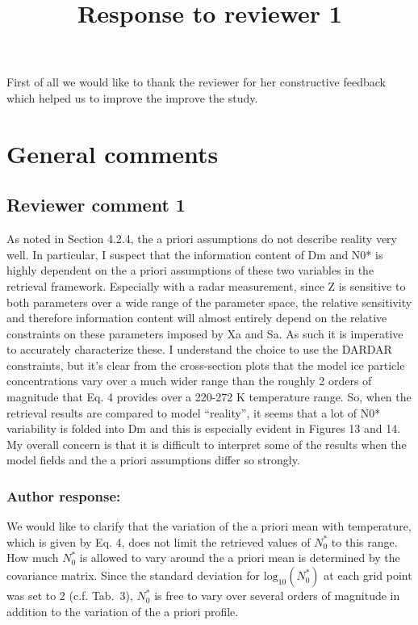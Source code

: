 \documentclass[11pt]{scrartcl}
\title{Response to reviewer 1}
\date{}
\begin{document}
\maketitle

\setlength{\parindent}{0cm}

First of all we would like to thank the reviewer for her constructive feedback
which helped us to improve the improve the study.

\section{General comments}

\subsection*{Reviewer comment 1}

As noted in Section 4.2.4, the a priori assumptions do not describe reality very
well. In particular, I suspect that the information content of Dm and N0* is
highly dependent on the a priori assumptions of these two variables in the
retrieval framework. Especially with a radar measurement, since Z is sensitive
to both parameters over a wide range of the parameter space, the relative
sensitivity and therefore information content will almost entirely depend on the
relative constraints on these parameters imposed by Xa and Sa. As such it is
imperative to accurately characterize these. I understand the choice to use the
DARDAR constraints, but it’s clear from the cross-section plots that the model
ice particle concentrations vary over a much wider range than the roughly 2
orders of magnitude that Eq. 4 provides over a 220-272 K temperature range. So,
when the retrieval results are compared to model “reality”, it seems that a lot
of N0* variability is folded into Dm and this is especially evident in Figures
13 and 14. My overall concern is that it is difficult to interpret some of the
results when the model fields and the a priori assumptions differ so strongly.

\subsubsection*{Author response:}

We would like to clarify that the variation of the a priori mean with
temperature, which is given by Eq. 4, does not limit the retrieved values of
$N_0^*$ to this range. How much $N_0^*$ is allowed to vary around the a priori
mean is determined by the covariance matrix. Since the standard deviation for
$\text{log}_{10}(N_0^*)$ at each grid point was set to $2$ (c.f. Tab.~3), $N_0^*$ is
free to vary over several orders of magnitude in addition to the variation of
the a priori profile.
\end{document}
